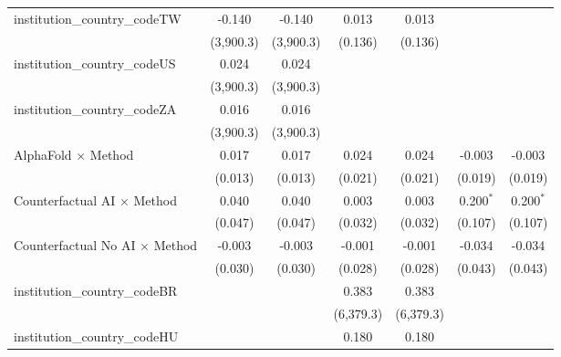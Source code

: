 \begin{tabular}{lcccccc}
   institution\_country\_codeTW          & -0.140         & -0.140         & 0.013         & 0.013         &                &   \\   
                                         & (3,900.3)      & (3,900.3)      & (0.136)       & (0.136)       &                &   \\   
   institution\_country\_codeUS          & 0.024          & 0.024          &               &               &                &   \\   
                                         & (3,900.3)      & (3,900.3)      &               &               &                &   \\   
   institution\_country\_codeZA          & 0.016          & 0.016          &               &               &                &   \\   
                                         & (3,900.3)      & (3,900.3)      &               &               &                &   \\   
   AlphaFold $\times$ Method             & 0.017          & 0.017          & 0.024         & 0.024         & -0.003         & -0.003\\   
                                         & (0.013)        & (0.013)        & (0.021)       & (0.021)       & (0.019)        & (0.019)\\   
   Counterfactual AI $\times$ Method     & 0.040          & 0.040          & 0.003         & 0.003         & 0.200$^{*}$    & 0.200$^{*}$\\   
                                         & (0.047)        & (0.047)        & (0.032)       & (0.032)       & (0.107)        & (0.107)\\   
   Counterfactual No AI $\times$ Method  & -0.003         & -0.003         & -0.001        & -0.001        & -0.034         & -0.034\\   
                                         & (0.030)        & (0.030)        & (0.028)       & (0.028)       & (0.043)        & (0.043)\\   
   institution\_country\_codeBR          &                &                & 0.383         & 0.383         &                &   \\   
                                         &                &                & (6,379.3)     & (6,379.3)     &                &   \\   
   institution\_country\_codeHU          &                &                & 0.180         & 0.180         &                &   \\   

\end{tabular}
